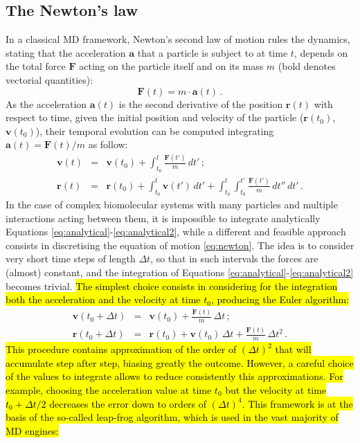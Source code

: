 \subsection{The Newton's law}

In a classical MD framework, Newton's second law of motion rules the dynamics, stating that the acceleration $\textbf{a}$ that a particle is subject to at time $t$, depends on the total force $\textbf{F}$ acting on the particle itself and on its mass $m$ (bold denotes vectorial quantities):
\begin{equation} \label{eq:newton}
\textbf{F}(t) =  m \cdot \textbf{a}(t) \, .
\end{equation}
As the acceleration $\textbf{a}(t)$ is the second derivative of the position $\textbf{r}(t)$ with respect to time, given the initial position and velocity of the particle ($\textbf{r}(t_0)$, $\textbf{v}(t_0)$), their temporal evolution can be computed integrating $\textbf{a}(t) = \textbf{F}(t)/m$ as follow:
\begin{eqnarray} \label{eq:analytical}
\mathbf{v}(t) &=& \mathbf{v}(t_0) + \int_{t_0}^t \frac{\mathbf{F}(t')}{m} \, dt' \, ; \\
\mathbf{r}(t) &=& \mathbf{r}(t_0) + \int_{t_0}^t \mathbf{v}(t') \, dt' + \int_{t_0}^t \int_{t_0}^{t'} \frac{\mathbf{F}(t')}{m} \, dt'' \, dt'\, . \label{eq:analytical2}
\end{eqnarray}
%
In the case of complex biomolecular systems with many particles and multiple interactions acting between them, it is impossible to integrate analytically Equations \ref{eq:analytical}-\ref{eq:analytical2}, while a different and feasible approach consists in discretising the equation of motion \ref{eq:newton}.
%
The idea is to consider very short time steps of length $\Delta t$, so that in such intervals the forces are (almost) constant, and the integration of Equations \ref{eq:analytical}-\ref{eq:analytical2} becomes trivial.
%
\hl{The simplest choice consists in considering for the integration both the acceleration and the velocity at time $t_0$, producing the Euler algorithm:}
\begin{eqnarray} \label{eq:euler}
\mathbf{v}(t_0 + \Delta t) &=& \mathbf{v}(t_0) + \frac{\mathbf{F}(t)}{m} \, \Delta t \,; \\
\mathbf{r}(t_0 + \Delta t) &=& \mathbf{r}(t_0) + \mathbf{v}(t_0) \, \Delta t + \frac{\mathbf{F}(t)}{m} \, \Delta t^2 \,. \label{eq:euler2}
\end{eqnarray}
%
\hl{This procedure contains approximation of the order of $(\Delta t)^2$ that will accumulate step after step, biasing greatly the outcome. However, a careful choice of the values to integrate allows to reduce consistently this approximations. For example, choosing the acceleration value at time $t_0$ but the velocity at time $t_0 + \Delta t/2$ decreases the error down to orders of $(\Delta t)^4$. This framework is at the basis of the so-called leap-frog algorithm, which is used in the vast majority of MD engines:}
